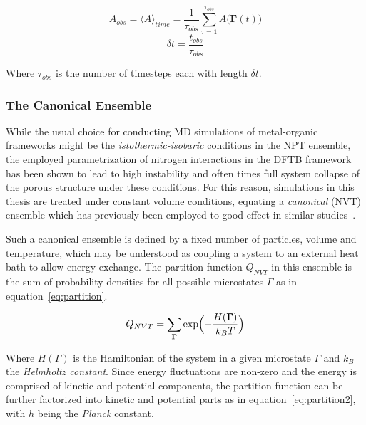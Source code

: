 \documentclass[11pt]{article}
\begin{document}
\begin{equation}
  A_{obs} = \langle A  \rangle_{time} = \frac{1}{\tau_{obs}}\sum_{\tau=1}^{\tau_{obs}}A\bigl(\mathbf{\Gamma}(t)\bigr)
  \label{eq:ergoden2}
\end{equation}
\begin{equation*}
  \delta t = \frac{t_{obs}}{\tau_{obs}}
\end{equation*}

\bigskip

\noindent Where $\tau_{obs}$ is the number of timesteps each with length $\delta t$.

\subsubsection{The Canonical Ensemble}
While the usual choice for conducting MD simulations of metal-organic frameworks might be the \textit{istothermic-isobaric} conditions in the NPT ensemble, the employed parametrization of nitrogen interactions in the DFTB framework has been shown to lead to high instability and often times full system collapse of the porous structure under these conditions. For this reason, simulations in this thesis are treated under constant volume conditions, equating a \textit{canonical} (NVT) ensemble which has previously been employed to good effect in similar studies~\cite{Fischereder2023}\cite{Purtscher2023}.
\\ \par \noindent
Such a canonical ensemble is defined by a fixed number of particles, volume and temperature, which may be understood as coupling a system to an external heat bath to allow energy exchange. The partition function $Q_{NVT}$ in this ensemble is the sum of probability densities for all possible microstates $\Gamma$ as in equation~\ref{eq:partition}.


\begin{equation}
  Q_{NVT} = \sum_{\mathbf{\Gamma}}^{}\exp\Bigl(-\frac{H(\mathbf{\Gamma})}{k_BT}\Bigl)
  \label{eq:partition}
\end{equation}

\bigskip

\noindent Where $H(\Gamma)$ is the Hamiltonian of the system in a given microstate $\Gamma$ and $k_B$ the \textit{Helmholtz constant}. Since energy fluctuations are non-zero and the energy is comprised of kinetic and potential components, the partition function can be further factorized into kinetic and potential parts as in equation~\ref{eq:partition2}, with $h$ being the \textit{Planck} constant.
\end{document}

